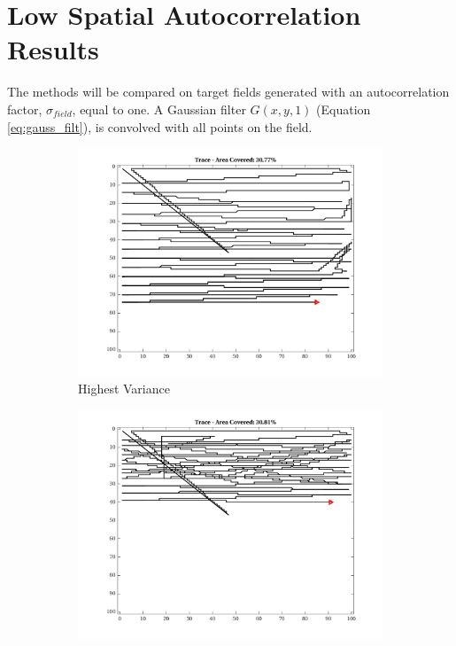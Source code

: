 \FloatBarrier
\clearpage

\section{Low Spatial Autocorrelation Results}
The methods will be compared on target fields generated with an autocorrelation factor, $\sigma_{field}$, equal to one. A Gaussian filter $G(x,y,1)$ (Equation \ref{eq:gauss_filt}), is convolved with all points on the field.

\begin{figure}[htb!]
    \centering
    \begin{subfigure}[t]{0.3333\textwidth}
        \centering
        \includegraphics[width=\linewidth]{figures/hbresults/path_nhv_30p_100x100_sf_1_seed_2.png}
        \captionsetup{skip=0.20\baselineskip,size=footnotesize}
        \caption{Highest Variance}
    \end{subfigure}%
    \begin{subfigure}[t]{0.3333\textwidth}
        \centering
        \includegraphics[width=\linewidth]{figures/hbresults/path_nnhv_30p_100x100_sf_1_seed_2.png}

\end{subfigure}
\end{figure}
